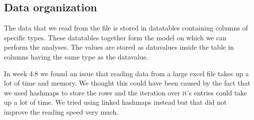 \documentclass[a4paper]{article}
\begin{document}
\subsection{Data organization}
The data that we read from the file is stored in datatables containing columns of specific types. These datatables together form the model on which we can perform the analyses. The values are stored as datavalues inside the table in columns having the same type as the datavalue.

In week 4.8 we found an issue that reading data from a large excel file takes up a lot of time and memory. We thought this could have been caused by the fact that we used hashmaps to store the rows and the iteration over it's entries could take up a lot of time. We tried using linked hashmaps instead but that did not improve the reading speed very much.
\end{document}
